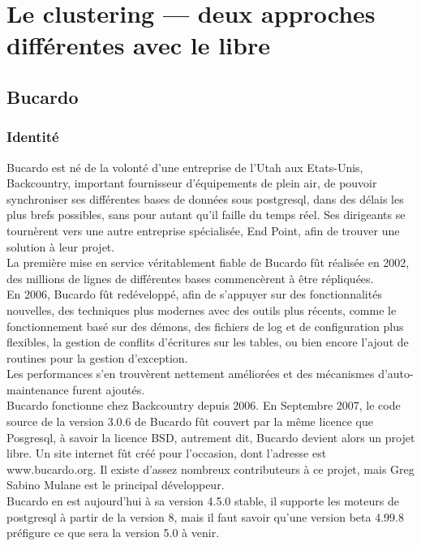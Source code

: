 \documentclass[12pt]{report}
\begin{document}
\chapter{Le clustering — deux approches différentes avec le libre}
\section{Bucardo}
\subsection{Identité}

Bucardo est né de la volonté d'une entreprise de l'Utah aux Etats-Unis,
Backcountry, important fournisseur d'équipements de plein air, de pouvoir
synchroniser ses différentes bases de données sous postgresql, dans des délais
les plus brefs possibles, sans pour autant qu'il faille du temps réel. Ses
dirigeants se tournèrent vers une autre entreprise spécialisée, End Point, afin
de trouver une solution à leur projet. \\

La première mise en service véritablement fiable de Bucardo fût réalisée en
2002, des millions de lignes de différentes bases commencèrent à être
répliquées. \\

En 2006, Bucardo fût redéveloppé, afin de s'appuyer sur des fonctionnalités
nouvelles, des techniques plus modernes avec des outils plus récents, comme le
fonctionnement basé sur des démons, des fichiers de log et de configuration plus
flexibles, la gestion de conflits d'écritures sur les tables, ou bien encore
l'ajout de routines pour la gestion d'exception. \\

Les performances s'en trouvèrent nettement améliorées et des mécanismes
d'auto-maintenance furent ajoutés. \\

Bucardo fonctionne chez Backcountry depuis 2006.
En Septembre 2007, le code source de la version 3.0.6 de Bucardo fût couvert par
la même licence que Posgresql, à savoir la licence BSD, autrement dit, Bucardo
devient alors un projet libre. Un site internet fût créé pour l'occasion, dont
l'adresse est www.bucardo.org. Il existe d'assez nombreux contributeurs à ce
projet, mais Greg Sabino Mulane est le principal développeur. \\

Bucardo en est aujourd'hui à sa version 4.5.0 stable, il supporte les moteurs de
postgresql à partir de la version 8, mais il faut savoir qu'une version beta
4.99.8 préfigure ce que sera la version 5.0 à venir. \\
\end{document}
